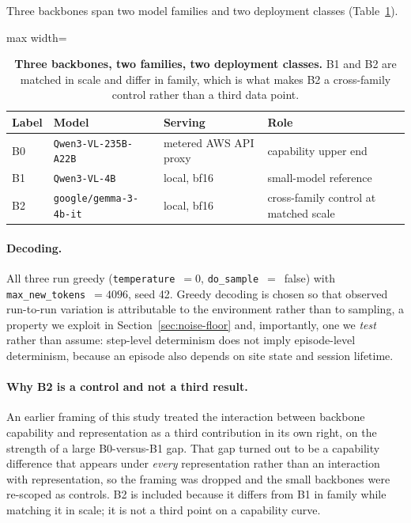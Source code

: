 Three backbones span two model families and two deployment classes
(Table~\ref{tab:backbones}).

\begin{table}[tb]
\centering\small
\caption[Backbone models]{\textbf{Three backbones, two families, two deployment
classes.} B1 and B2 are matched in scale and differ in family, which is what
makes B2 a cross-family control rather than a third data point.}
\label{tab:backbones}
\begin{adjustbox}{max width=\textwidth}
\begin{tabular}{@{}llll@{}}
\toprule
Label & Model & Serving & Role \\
\midrule
B0 & \texttt{Qwen3-VL-235B-A22B} & metered AWS API proxy & capability upper end \\
B1 & \texttt{Qwen3-VL-4B}        & local, bf16       & small-model reference \\
B2 & \texttt{google/gemma-3-4b-it} & local, bf16     & cross-family control at matched scale \\
\bottomrule
\end{tabular}
\end{adjustbox}
\end{table}

\paragraph{Decoding.} All three run greedy (\texttt{temperature}~$=0$,
\texttt{do\_sample}~$=$~false) with \texttt{max\_new\_tokens}~$=4096$, seed 42.
Greedy decoding is chosen so that observed run-to-run variation is attributable to the environment rather than to sampling, a property we exploit in
Section~\ref{sec:noise-floor} and, importantly, one we \emph{test} rather than
assume: step-level determinism does not imply episode-level determinism, because an episode also depends on site state and session lifetime.

\paragraph{Why B2 is a control and not a third result.} An earlier framing of
this study treated the interaction between backbone capability and
representation as a third contribution in its own right, on the strength of a
large B0-versus-B1 gap. That gap turned out to be a capability difference that
appears under \emph{every} representation rather than an interaction with
representation, so the framing was dropped and the small backbones were
re-scoped as controls. B2 is included because it differs from B1 in family while matching it in scale; it is not a third point on a capability curve.

